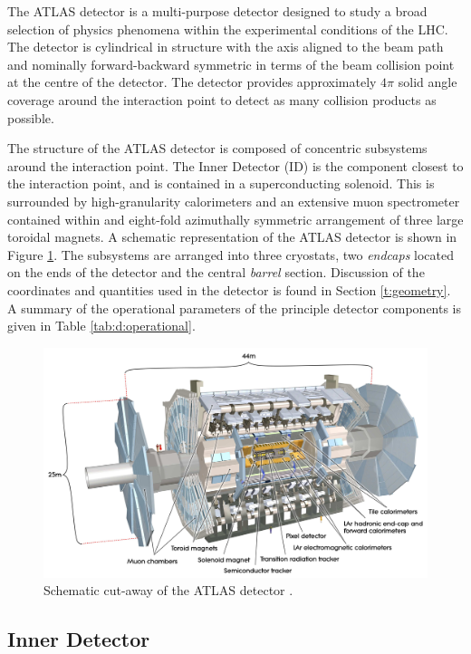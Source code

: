 	The ATLAS detector \cite{ATLAS} is a multi-purpose detector designed to study a broad selection of physics phenomena within the experimental conditions of the LHC. The detector is cylindrical in structure with the axis aligned to the beam path and nominally forward-backward symmetric in terms of the beam collision point at the centre of the detector. The detector provides approximately $4\pi$ solid angle coverage around the interaction point to detect as many collision products as possible.

	The structure of the ATLAS detector is composed of concentric subsystems around the interaction point.  The Inner Detector (ID) is the component closest to the interaction point, and is contained in a superconducting solenoid. This is surrounded by high-granularity calorimeters and an extensive muon spectrometer contained within and eight-fold azimuthally symmetric arrangement of three large toroidal magnets. A schematic representation of the ATLAS detector is shown in Figure \ref{fig:t:ATLAS}. 	The subsystems are arranged into three cryostats, two \textit{endcaps} located on the ends of the detector and the central \textit{barrel} section. Discussion of the coordinates and quantities used in the detector is found in Section \ref{t:geometry}. A summary of the operational parameters of the principle detector components is given in Table \ref{tab:d:operational}.

	\begin{figure}[h]
		\centering
		\includegraphics[width=0.7\linewidth]{D/FIGS/ATLAS_SE_Corrected7}
		\caption{Schematic cut-away of the ATLAS detector \cite{ATLASSchem}.}
		\label{fig:t:ATLAS}
	\end{figure}



	\subsection{Inner Detector}

